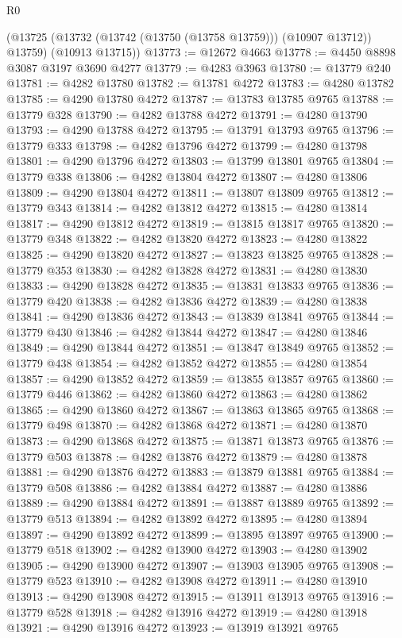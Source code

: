 \begin{lexlean}{R0}
\begin{coremodule}
      (@13725 (@13732 (@13742 (@13750 (@13758 @13759))) (@10907 @13712)) @13759)
      (@10913 @13715))
@13773 := @12672 @4663
@13778 := @4450 @8898 @3087 @3197 @3690 @4277
@13779 := @4283 @3963
@13780 := @13779 @240
@13781 := @4282 @13780
@13782 := @13781 @4272
@13783 := @4280 @13782
@13785 := @4290 @13780 @4272
@13787 := @13783 @13785 @9765
@13788 := @13779 @328
@13790 := @4282 @13788 @4272
@13791 := @4280 @13790
@13793 := @4290 @13788 @4272
@13795 := @13791 @13793 @9765
@13796 := @13779 @333
@13798 := @4282 @13796 @4272
@13799 := @4280 @13798
@13801 := @4290 @13796 @4272
@13803 := @13799 @13801 @9765
@13804 := @13779 @338
@13806 := @4282 @13804 @4272
@13807 := @4280 @13806
@13809 := @4290 @13804 @4272
@13811 := @13807 @13809 @9765
@13812 := @13779 @343
@13814 := @4282 @13812 @4272
@13815 := @4280 @13814
@13817 := @4290 @13812 @4272
@13819 := @13815 @13817 @9765
@13820 := @13779 @348
@13822 := @4282 @13820 @4272
@13823 := @4280 @13822
@13825 := @4290 @13820 @4272
@13827 := @13823 @13825 @9765
@13828 := @13779 @353
@13830 := @4282 @13828 @4272
@13831 := @4280 @13830
@13833 := @4290 @13828 @4272
@13835 := @13831 @13833 @9765
@13836 := @13779 @420
@13838 := @4282 @13836 @4272
@13839 := @4280 @13838
@13841 := @4290 @13836 @4272
@13843 := @13839 @13841 @9765
@13844 := @13779 @430
@13846 := @4282 @13844 @4272
@13847 := @4280 @13846
@13849 := @4290 @13844 @4272
@13851 := @13847 @13849 @9765
@13852 := @13779 @438
@13854 := @4282 @13852 @4272
@13855 := @4280 @13854
@13857 := @4290 @13852 @4272
@13859 := @13855 @13857 @9765
@13860 := @13779 @446
@13862 := @4282 @13860 @4272
@13863 := @4280 @13862
@13865 := @4290 @13860 @4272
@13867 := @13863 @13865 @9765
@13868 := @13779 @498
@13870 := @4282 @13868 @4272
@13871 := @4280 @13870
@13873 := @4290 @13868 @4272
@13875 := @13871 @13873 @9765
@13876 := @13779 @503
@13878 := @4282 @13876 @4272
@13879 := @4280 @13878
@13881 := @4290 @13876 @4272
@13883 := @13879 @13881 @9765
@13884 := @13779 @508
@13886 := @4282 @13884 @4272
@13887 := @4280 @13886
@13889 := @4290 @13884 @4272
@13891 := @13887 @13889 @9765
@13892 := @13779 @513
@13894 := @4282 @13892 @4272
@13895 := @4280 @13894
@13897 := @4290 @13892 @4272
@13899 := @13895 @13897 @9765
@13900 := @13779 @518
@13902 := @4282 @13900 @4272
@13903 := @4280 @13902
@13905 := @4290 @13900 @4272
@13907 := @13903 @13905 @9765
@13908 := @13779 @523
@13910 := @4282 @13908 @4272
@13911 := @4280 @13910
@13913 := @4290 @13908 @4272
@13915 := @13911 @13913 @9765
@13916 := @13779 @528
@13918 := @4282 @13916 @4272
@13919 := @4280 @13918
@13921 := @4290 @13916 @4272
@13923 := @13919 @13921 @9765

\end{coremodule}
\end{lexlean}
